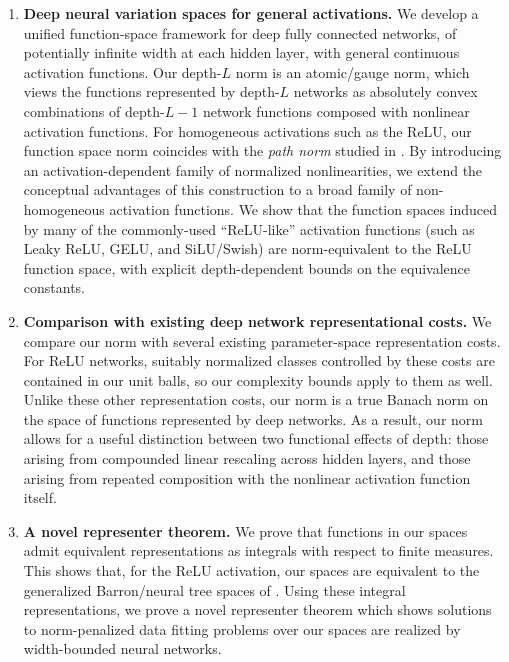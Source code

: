 \documentclass{article}
\begin{document}
\begin{enumerate}

    \item \textbf{Deep neural variation spaces for general activations.}
    We develop a unified function-space framework for deep fully connected networks, of potentially infinite width at each hidden layer, with general continuous activation functions. Our depth-$L$ norm is an atomic/gauge norm, which views the functions represented by depth-$L$ networks as absolutely convex combinations of depth-$L-1$ network functions composed with nonlinear activation functions. For homogeneous activations such as the ReLU, our function space norm coincides with the \textit{path norm} studied in \cite{neyshabur2015norm,barron2019complexity,wojtowytsch2020banach}. By introducing an activation-dependent family of normalized nonlinearities, we extend the conceptual advantages of this construction to a broad family of non-homogeneous activation functions. We show that the function spaces induced by many of the commonly-used ``ReLU-like'' activation functions (such as Leaky ReLU, GELU, and SiLU/Swish) are norm-equivalent to the ReLU function space, with explicit depth-dependent bounds on the equivalence constants.
    
    \item \textbf{Comparison with existing deep network representational costs.} We compare our norm with several existing parameter-space representation costs. For ReLU networks, suitably normalized classes controlled by these costs are contained in our unit balls, so our complexity bounds apply to them as well. Unlike these other representation costs, our norm is a true Banach norm on the space of functions represented by deep networks. As a result, our norm allows for a useful distinction between two functional effects of depth: those arising from compounded linear rescaling across hidden layers, and those arising from repeated composition with the nonlinear activation function itself. 
    
    \item \textbf{A novel representer theorem.} We prove that functions in our spaces admit equivalent representations as integrals with respect to finite measures. This shows that, for the ReLU activation, our spaces are equivalent to the generalized Barron/neural tree spaces of \cite{wojtowytsch2020banach}. Using these integral representations, we prove a novel representer theorem which shows solutions to norm-penalized data fitting problems over our spaces are realized by width-bounded neural networks.
    

\end{enumerate}
\end{document}
